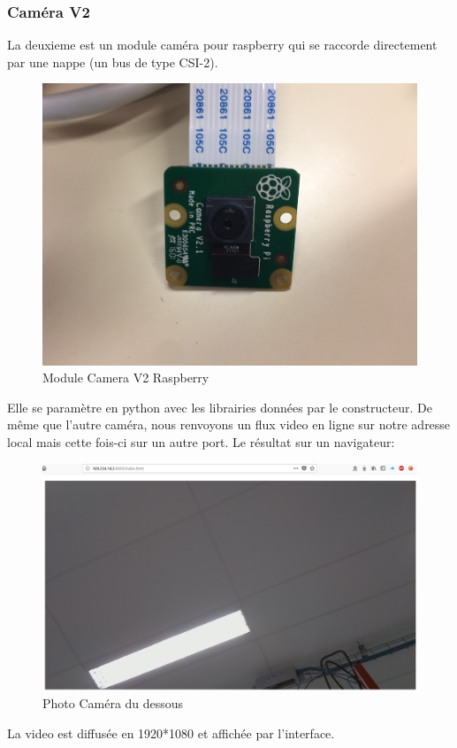 \documentclass[a4paper,11pt]{report}
\begin{document}
				\subsubsection{Caméra V2}
					La deuxieme est un module caméra pour raspberry \cite{ref2} qui se raccorde directement par une nappe (un bus de type CSI-2). 
					\begin{figure}[!h]
					\begin{center}
						\includegraphics[scale=0.1]{Photos/Camera21.jpg}
						\caption{Module Camera V2 Raspberry}
					\end{center}
				\end{figure}
				\newline Elle se paramètre en python avec les librairies données par le constructeur. De même que l'autre caméra, nous renvoyons un flux video en ligne sur notre adresse local \cite{ref3} mais cette fois-ci sur un autre port.
				\newline
				\newline Le résultat sur un navigateur:
					\begin{figure}[!h]
					\begin{center}
						\includegraphics[scale=0.3]{Photos/Camera2.png}
						\caption{Photo Caméra du dessous}
					\end{center}
				\end{figure}
				\newline La video est diffusée en 1920*1080 et affichée par l'interface.
				
\end{document}
